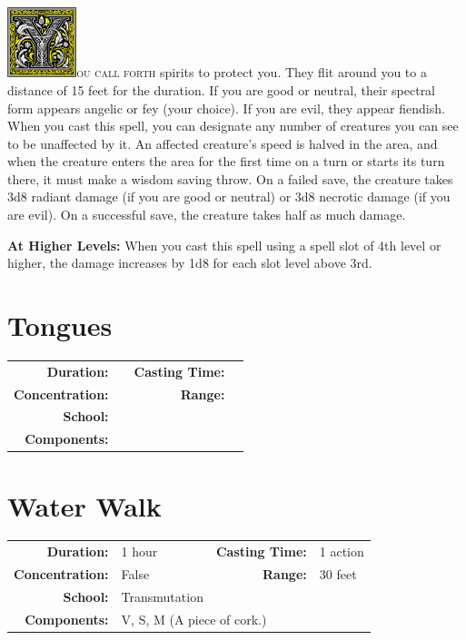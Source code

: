 \documentclass[12pt,showtrims]{memoir}
\begin{document}
\vspace{1\baselineskip}\noindent 
\lettrine[lines=4]{\includegraphics[height=58pt]{initials/Y.png}}{ou call forth} spirits to protect you. They flit around you to a distance of 15 feet for the duration. If you are good or neutral, their spectral form appears angelic or fey (your choice). If you are evil, they appear fiendish. When you cast this spell, you can designate any number of creatures you can see to be unaffected by it. An affected creature's speed is halved in the area, and when the creature enters the area for the first time on a turn or starts its turn there, it must make a wisdom saving throw. On a failed save, the creature takes 3d8 radiant damage (if you are good or neutral) or 3d8 necrotic damage (if you are evil). On a successful save, the creature takes half as much damage.

\vspace{8pt} \noindent\textbf{At Higher Levels:} When you cast this spell using a spell slot of 4th level or higher, the damage increases by 1d8 for each slot level above 3rd.
\newpage
\section*{Tongues}
{
\small\centering\vspace{-6pt}
\begin{tabular}{rlrl}
\toprule

\textbf{Duration:} &  &
\textbf{Casting Time:} &  \\
\textbf{Concentration:} & &
\textbf{Range:} &  \\
\textbf{School:} &  \\
\textbf{Components:} & \multicolumn{3}{p{0.7\textwidth}}{}\\

\bottomrule
\end{tabular}
}
\newpage
\section*{Water Walk}

{
\small\centering\vspace{-6pt}
\begin{tabular}{rlrl}
\toprule

\textbf{Duration:} & 1 hour &
\textbf{Casting Time:} & 1 action \\
\textbf{Concentration:} & False &
\textbf{Range:} & 30 feet \\
\textbf{School:} & Transmutation \\
\textbf{Components:} & \multicolumn{3}{p{0.7\textwidth}}{V, S, M (A piece of cork.)}\\

\bottomrule
\end{tabular}
}
\end{document}
